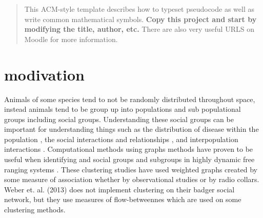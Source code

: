 \documentclass{sig-alternate-05-2015}
\begin{document}
\maketitle

\begin{abstract}
This ACM-style template describes how to typeset pseudocode as well as write common mathematical symbols.  \textbf{Copy this project and start by modifying the title, author, etc.}  There are also very useful URLS on Moodle for more information.
\end{abstract}


\section{modivation}
\indent Animals of some species tend to not be randomly distributed throughout space, instead animals tend to be group up into populations and sub populational groups including social groups. Understanding these social groups can be important for understanding things such as the distribution of disease within the population \cite{weber-2013}, the social interactions and relationships \cite{Ramos-Fernadez-2009}, and interpopulation interactions \cite{marth-2011}. Computational methods using graphs methods have proven to be useful when identifying and social groups and subgroups in highly dynamic free ranging systems \cite{Ramos-Fernandez-2009,marsh-2011}. These clustering studies have used weighted graphs created by some measure of association whether by observational studies or by radio collars. Weber et. al. (2013) does not implement clustering on their badger social network, but they use measures of flow-betweennes which are used on some clustering methods.  
\end{document}

